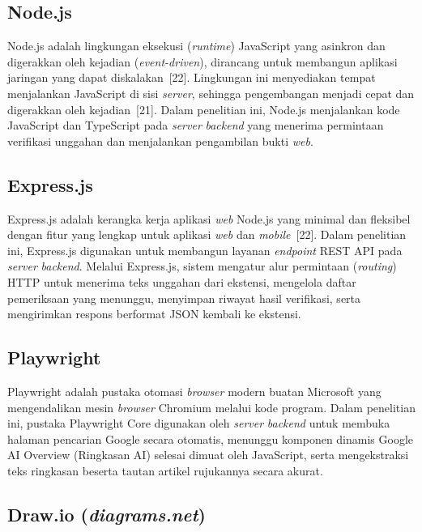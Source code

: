\documentclass[12pt,a4paper,twoside]{report}
\begin{document}
\subsection{Node.js}

Node.js adalah lingkungan eksekusi (\textit{runtime}) JavaScript yang asinkron dan digerakkan oleh kejadian (\textit{event-driven}), dirancang untuk membangun aplikasi jaringan yang dapat diskalakan~[22]. Lingkungan ini menyediakan tempat menjalankan JavaScript di sisi \textit{server}, sehingga pengembangan menjadi cepat dan digerakkan oleh kejadian~[21]. Dalam penelitian ini, Node.js menjalankan kode JavaScript dan TypeScript pada \textit{server} \textit{backend} yang menerima permintaan verifikasi unggahan dan menjalankan pengambilan bukti \textit{web}.

\subsection{Express.js}

Express.js adalah kerangka kerja aplikasi \textit{web} Node.js yang minimal dan fleksibel dengan fitur yang lengkap untuk aplikasi \textit{web} dan \textit{mobile}~[22]. Dalam penelitian ini, Express.js digunakan untuk membangun layanan \textit{endpoint} REST API pada \textit{server} \textit{backend}. Melalui Express.js, sistem mengatur alur permintaan (\textit{routing}) HTTP untuk menerima teks unggahan dari ekstensi, mengelola daftar pemeriksaan yang menunggu, menyimpan riwayat hasil verifikasi, serta mengirimkan respons berformat JSON kembali ke ekstensi.

\subsection{Playwright}

Playwright adalah pustaka otomasi \textit{browser} modern buatan Microsoft yang mengendalikan mesin \textit{browser} Chromium melalui kode program. Dalam penelitian ini, pustaka Playwright Core digunakan oleh \textit{server} \textit{backend} untuk membuka halaman pencarian Google secara otomatis, menunggu komponen dinamis Google AI Overview (Ringkasan AI) selesai dimuat oleh JavaScript, serta mengekstraksi teks ringkasan beserta tautan artikel rujukannya secara akurat.

\subsection{Draw.io (\textit{diagrams.net})}
\end{document}
